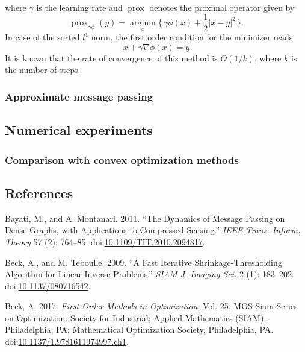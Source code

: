 \documentclass[]{article}
\begin{document}
where \(\gamma\) is the learning rate and \(\operatorname{prox}\)
denotes the proximal operator given by \[
  \operatorname{prox}_{\gamma\phi}(y) = \operatorname*{argmin}_x \{\, \gamma\phi(x) + \frac{1}{2}\vert x- y \vert^2 \,\}.
\] In case of the sorted \(l^1\) norm, the first order condition for the
minimizer reads \[
  x + \gamma\nabla\phi(x) = y
\] It is known that the rate of convergence of this method is
\(O(1/k)\), where \(k\) is the number of steps.

\subsubsection{Approximate message
passing}\label{approximate-message-passing}

\subsection{Numerical experiments}\label{numerical-experiments}

\subsubsection{Comparison with convex optimization
methods}\label{comparison-with-convex-optimization-methods}

\subsection*{References}\label{references}

\hypertarget{refs}{}
\hypertarget{ref-MR2810285}{}
Bayati, M., and A. Montanari. 2011. ``The Dynamics of Message Passing on
Dense Graphs, with Applications to Compressed Sensing.'' \emph{IEEE
Trans. Inform. Theory} 57 (2): 764--85.
doi:\href{https://doi.org/10.1109/TIT.2010.2094817}{10.1109/TIT.2010.2094817}.

\hypertarget{ref-MR2486527}{}
Beck, A., and M. Teboulle. 2009. ``A Fast Iterative
Shrinkage-Thresholding Algorithm for Linear Inverse Problems.''
\emph{SIAM J. Imaging Sci.} 2 (1): 183--202.
doi:\href{https://doi.org/10.1137/080716542}{10.1137/080716542}.

\hypertarget{ref-MR3719240}{}
Beck, A. 2017. \emph{First-Order Methods in Optimization}. Vol. 25.
MOS-Siam Series on Optimization. Society for Industrial; Applied
Mathematics (SIAM), Philadelphia, PA; Mathematical Optimization Society,
Philadelphia, PA.
doi:\href{https://doi.org/10.1137/1.9781611974997.ch1}{10.1137/1.9781611974997.ch1}.
\end{document}
